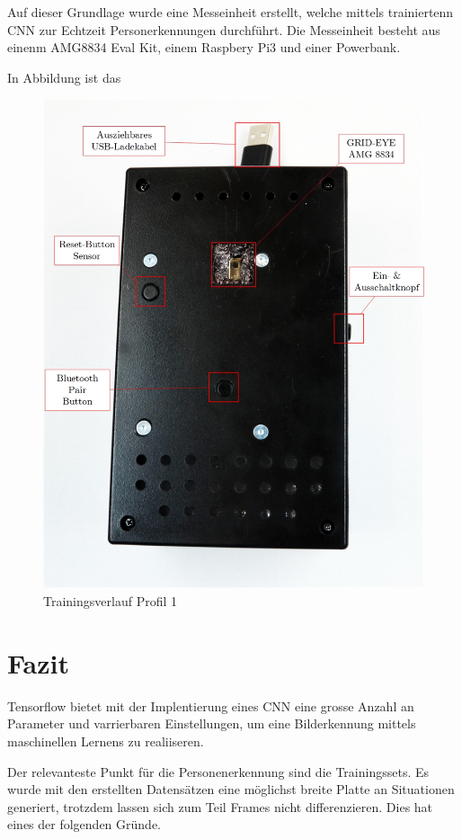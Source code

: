 Auf dieser Grundlage wurde eine Messeinheit erstellt, welche mittels trainiertenn CNN zur Echtzeit Personerkennungen durchführt. Die Messeinheit besteht aus einenm AMG8834 Eval Kit, einem Raspbery Pi3 und einer Powerbank.

In Abbildung ist das 


\begin{figure}[H]
	\centering
	\label{fig:Echtzeitmesseinheit}
	\includegraphics[width=0.8\linewidth]{fig/Echtzeitmessgeraet.jpg}
		\caption{Trainingsverlauf Profil 1}
\end{figure}




\section{Fazit}

Tensorflow bietet mit der Implentierung eines \ac{CNN} eine grosse Anzahl an Parameter und varrierbaren Einstellungen, um eine Bilderkennung mittels maschinellen Lernens zu realiiseren. 

Der relevanteste Punkt für die Personenerkennung sind die Trainingssets. Es wurde mit den erstellten Datensätzen eine möglichst breite Platte an Situationen generiert, trotzdem lassen sich zum Teil Frames nicht differenzieren. Dies hat eines der folgenden Gründe.

